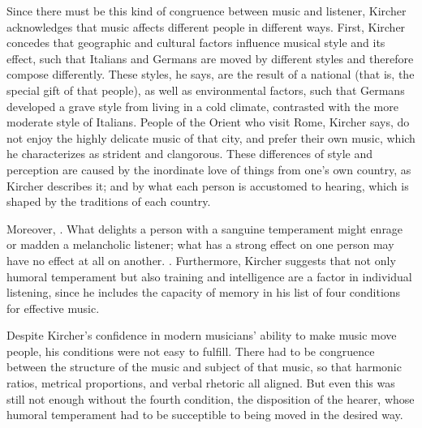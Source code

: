 Since there must be this kind of congruence between music and listener, Kircher
acknowledges that music affects different people in different ways.
First, Kircher concedes that geographic and cultural factors influence musical
style and its effect, such that Italians and Germans are moved by different
styles and therefore compose differently.
These styles, he says, are the result of a national  (that is,
the special gift of that people), as well as environmental factors, such that
Germans developed a grave style from living in a cold climate, contrasted with
the more moderate style of Italians.
People of the Orient who visit Rome, Kircher says, do not enjoy the highly
delicate music of that city, and prefer their own music, which he characterizes
as strident and clangorous.
These differences of style and perception are caused by the inordinate love of
things from one's own country, as Kircher describes it; and by what each person
is accustomed to hearing, which is shaped by the traditions of each country.%
    \Autocites[543--544]{Kircher:Musurgia}

Moreover, .%
    \Autocite[544]{Kircher:Musurgia}
What delights a person with a sanguine temperament might enrage or madden a
melancholic listener; what has a strong effect on one person may have no effect
at all on another.
.%
    \Autocite[550]{Kircher:Musurgia}
Furthermore, Kircher suggests that not only humoral temperament but also
training and intelligence are a factor in individual listening, since he
includes the capacity of memory in his list of four conditions for effective
music.


Despite Kircher's confidence in modern musicians' ability to make music move
people, his conditions were not easy to fulfill.
There had to be congruence between the structure of the music and subject of
that music, so that harmonic ratios, metrical proportions, and verbal rhetoric
all aligned.
But even this was still not enough without the fourth condition, the
disposition of the hearer, whose humoral temperament had to be succeptible to
being moved in the desired way.

